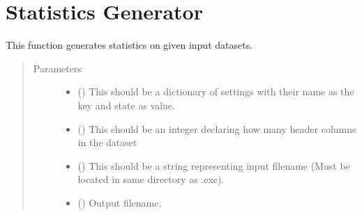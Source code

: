 \documentclass[letterpaper,10pt,english,openany,oneside]{sphinxmanual}
\begin{document}
\chapter{Statistics Generator}
\label{\detokenize{index:module-Statistics_Generator}}\label{\detokenize{index:statistics-generator}}

\begin{fulllineitems}
\label{\detokenize{index:Statistics_Generator.Statistics_Generator}}
This function generates statistics on given input datasets.
\begin{quote}\begin{description}
\item[{Parameters}] \leavevmode\begin{itemize}
\item {} 
 (\sphinxstyleliteralemphasis{\sphinxupquote{{[}}}\sphinxstyleliteralemphasis{\sphinxupquote{{]}}}\sphinxstyleliteralemphasis{\sphinxupquote{}}) \textendash{} This should be a dictionary of settings with their name as the key and state as value.

\item {} 
 () \textendash{} This should be an integer declaring how many header columns in the dataset

\item {} 
 () \textendash{} This should be a string representing input filename (Must be located in same directory as .exe).

\item {} 
 () \textendash{} Output filename.

\end{itemize}

\end{description}\end{quote}

\end{fulllineitems}
\end{document}
